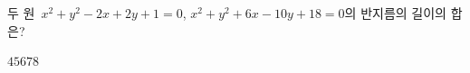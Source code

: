 두 원~$x^2+y^2-2x+2y+1=0$, $x^2+y^2+6x-10y+18=0$의 반지름의 길이의 합은?
\begin{choices32}{$4$}{$5$}{$6$}{$7$}{$8$}\end{choices32}
